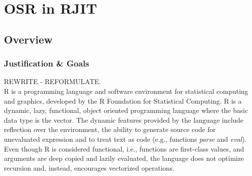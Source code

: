 
\chapter{OSR in RJIT} %

\label{Chapter4New} %


\newcommand{\keyword}[1]{\textbf{#1}}
\newcommand{\tabhead}[1]{\textbf{#1}}
\newcommand{\code}[1]{\texttt{#1}}
\newcommand{\file}[1]{\texttt{\bfseries#1}}
\newcommand{\option}[1]{\texttt{\itshape#1}}

\section{Overview}
\subsection{Justification \& Goals}
REWRITE - REFORMULATE.\\

            
R is a programming language and software environment for statistical computing and graphics, developed by the R Foundation for Statistical Computing\cite{RURL}.
R is a dynamic, lazy, functional, object oriented programming language where the basic data type is the vector.
The dynamic features provided by the language include reflection over the environment, the ability to generate source code for unevaluated expression and to treat text as code (e.g., functions \textit{parse} and \textit{eval}).
Even though R is considered functional, i.e., functions are first-class values, and arguments are deep copied and lazily evaluated, the language does not optimize recursion and, instead, encourages vectorized operations.\\

